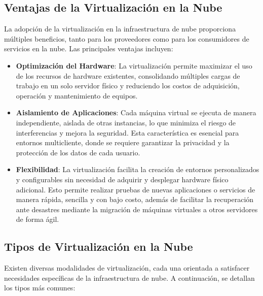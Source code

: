 {        \subsection{Ventajas de la Virtualización en la Nube}
            La adopción de la virtualización en la infraestructura de nube proporciona múltiples beneficios, tanto para los proveedores como para los consumidores de servicios en la nube. Las principales ventajas incluyen:
            
            \begin{itemize}
                \item \textbf{Optimización del Hardware}: La virtualización permite maximizar el uso de los recursos de hardware existentes, consolidando múltiples cargas de trabajo en un solo servidor físico y reduciendo los costos de adquisición, operación y mantenimiento de equipos.
                \item \textbf{Aislamiento de Aplicaciones}: Cada máquina virtual se ejecuta de manera independiente, aislada de otras instancias, lo que minimiza el riesgo de interferencias y mejora la seguridad. Esta característica es esencial para entornos multicliente, donde se requiere garantizar la privacidad y la protección de los datos de cada usuario.
                \item \textbf{Flexibilidad}: La virtualización facilita la creación de entornos personalizados y configurables sin necesidad de adquirir y desplegar hardware físico adicional. Esto permite realizar pruebas de nuevas aplicaciones o servicios de manera rápida, sencilla y con bajo costo, además de facilitar la recuperación ante desastres mediante la migración de máquinas virtuales a otros servidores de forma ágil.
            \end{itemize}
            
        \subsection{Tipos de Virtualización en la Nube}
            Existen diversas modalidades de virtualización, cada una orientada a satisfacer necesidades específicas de la infraestructura de nube. A continuación, se detallan los tipos más comunes:
            
}
